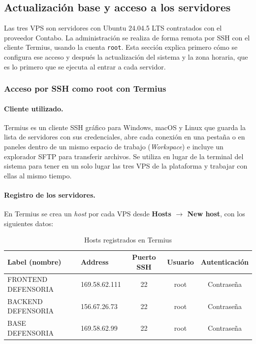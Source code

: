 \subsection{Actualización base y acceso a los servidores}\label{sec:2_1_actualizacion_acceso}
Las tres VPS son servidores con Ubuntu 24.04.5 LTS contratados con el proveedor Contabo. La administración se realiza de forma remota por SSH con el cliente Termius, usando la cuenta \texttt{root}. Esta sección explica primero cómo se configura ese acceso y después la actualización del sistema y la zona horaria, que es lo primero que se ejecuta al entrar a cada servidor.

\subsubsection{Acceso por SSH como root con Termius}
\paragraph{Cliente utilizado.} Termius es un cliente SSH gráfico para Windows, macOS y Linux que guarda la lista de servidores con sus credenciales, abre cada conexión en una pestaña o en paneles dentro de un mismo espacio de trabajo (\emph{Workspace}) e incluye un explorador SFTP para transferir archivos. Se utiliza en lugar de la terminal del sistema para tener en un solo lugar las tres VPS de la plataforma y trabajar con ellas al mismo tiempo.

\paragraph{Registro de los servidores.} En Termius se crea un \emph{host} por cada VPS desde \textbf{Hosts $\rightarrow$ New host}, con los siguientes datos:

\begin{table}[H]
\centering
\caption{Hosts registrados en Termius}
\small
\begin{tabular}{llccc}
\toprule
\textbf{Label (nombre)} & \textbf{Address} & \textbf{Puerto SSH} & \textbf{Usuario} & \textbf{Autenticación} \\
\midrule
FRONTEND DEFENSORIA & 169.58.62.111 & 22 & root & Contraseña \\
BACKEND DEFENSORIA & 156.67.26.73 & 22 & root & Contraseña \\
BASE DEFENSORIA & 169.58.62.99 & 22 & root & Contraseña \\
\bottomrule
\end{tabular}
\end{table}

